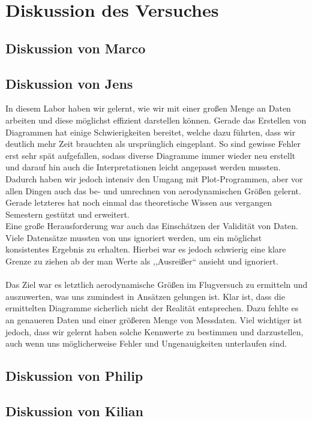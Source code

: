 \chapter{Diskussion des Versuches}
\label{chapter:fazit}
\section{Diskussion von Marco}
\newpage

\section{Diskussion von Jens}
In diesem Labor haben wir gelernt, wie wir mit einer großen Menge an Daten arbeiten und diese möglichst effizient darstellen können. Gerade das Erstellen von Diagrammen hat einige Schwierigkeiten bereitet, welche dazu führten, dass wir deutlich mehr Zeit brauchten als ursprünglich eingeplant. So sind gewisse Fehler erst sehr spät aufgefallen, sodass diverse Diagramme immer wieder neu erstellt und darauf hin auch die Interpretationen leicht angepasst werden mussten. Dadurch haben wir jedoch intensiv den Umgang mit Plot-Programmen, aber vor allen Dingen auch das be- und umrechnen von aerodynamischen Größen gelernt. Gerade letzteres hat noch einmal das theoretische Wissen aus vergangen Semestern gestützt und erweitert.\\
Eine große Herausforderung war auch das Einschätzen der Validität von Daten. Viele Datensätze mussten von uns ignoriert werden, um ein möglichst konsistentes Ergebnis zu erhalten. Hierbei war es jedoch schwierig eine klare Grenze zu ziehen ab der man Werte als ,,Ausreißer`` ansieht und ignoriert.\\\\
Das Ziel war es letztlich aerodynamische Größen im Flugversuch zu ermitteln und auszuwerten, was uns zumindest in Ansätzen gelungen ist. Klar ist, dass die ermittelten Diagramme sicherlich nicht der Realität entsprechen. Dazu fehlte es an genaueren Daten und einer größeren Menge von Messdaten. Viel wichtiger ist jedoch, dass wir gelernt haben solche Kennwerte zu bestimmen und darzustellen, auch wenn uns möglicherweise Fehler und Ungenauigkeiten unterlaufen sind.

\newpage

\section{Diskussion von Philip}
\newpage

\section{Diskussion von Kilian}

